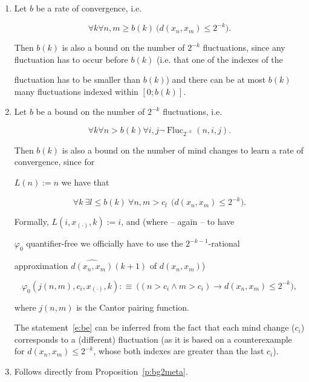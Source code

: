 \documentclass[1p]{elsarticle}
\DeclareMathOperator{\Fluc}{Fluc}
\theoremstyle{plain}
\theoremstyle{definition}
\theoremstyle{remark}
\renewenvironment{proof}[1][]{\noindent{\bf Proof{#1}. }}{\nopagebreak[4]{\hspace*{\fill}


  $\Box$              %

 }{\vspace{2ex}}}
\renewcommand{\phi}{\varphi}
\theoremstyle{definition}
\begin{document}
{\begin{proof}
\begin{enumerate}
\item Let $b$ be a rate of convergence, i.e.

\[ \forall k \forall n,m\geq b(k)\ \big( d(x_n,x_m)\leq 2^{-k}\big). \]

Then $b(k)$ is also a bound on the number of $2^{-k}$ fluctuations, since any fluctuation has to occur before $b(k)$ (i.e. that one of the indexes of the 

fluctuation has to be smaller than $b(k)$) and there can be at most $b(k)$ many fluctuations indexed within $[0;b(k)]$.

\item Let $b$ be a bound on the number of $2^{-k}$ fluctuations, i.e.

\[ \forall k \forall n>b(k) \forall i,j \neg\Fluc_{2^{-k}}(n,i,j). \]

Then $b(k)$ is also a bound on the number of mind changes to learn a rate of convergence, since for 

$L(n):=n$ we have that

\[ \forall k\ \exists l\leq b(k)\ \forall n,m>c_l\ \ \big(  d(x_n,x_m)\leq 2^{-k}\big). \tag{BE}\label{e:be}\]

%



Formally, $L(i,x_{(\cdot)},k):=i$, and (where -- again -- to have 

$\varphi_0$ quantifier-free we officially have to use the $2^{-k-1}$-rational 

approximation $\widehat{d(x_n,x_m)}(k+1)$ of $d(x_n,x_m)$) 

\[

\phi_0(j(n,m),c_i,x_{(\cdot)},k):\equiv\ \big((n>c_i \wedge m>c_i) \rightarrow d(x_n,x_m)\leq 2^{-k}\big),

\]

where $j(n,m)$ is the Cantor pairing function.

%

The statement~\eqref{e:be} can be inferred from the fact that each mind change ($c_i$) corresponds to a (different) fluctuation (as it is based on a counterexample for $d(x_n,x_m)\leq 2^{-k}$, whose both indexes are greater than the last $c_i$).

\item Follows directly from Proposition~\ref{p:bg2meta}.

\end{enumerate}

\end{proof}







}
\end{document}
